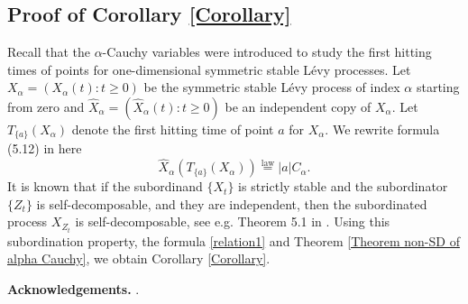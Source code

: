\documentclass[12pt]{amsart}
\begin{document}
\subsection{Proof of Corollary \ref{Corollary}}
Recall that the $\alpha$-Cauchy variables were introduced to study the first hitting times of points for one-dimensional symmetric stable L\'evy processes. 
Let $X_\alpha = (X_\alpha(t): t\geq 0)$ be the symmetric stable L\'evy process of index $\alpha$ starting from zero and \(\hat{X}_\alpha = (\hat{X}_\alpha(t) : t \geq 0)\) be an independent copy of \(X_\alpha\).
Let $T_{\{a\}}(X_\alpha)$ denote the first hitting time of point $a$ for $X_\alpha$. We rewrite formula (5.12) in \cite{YYY09} here
 \begin{equation}
    \label{relation1}
\hat{X}_{\alpha}(T_{\{a\}}(X_{\alpha})) \overset{\text{law}}{=} |a|C_{\alpha}. 
 \end{equation}
It is known that if the subordinand $\{X_t\}$ is strictly stable and the subordinator $\{Z_t\}$ is self-decomposable, and they are independent, then the subordinated process ${X_{Z_t}}$ is self-decomposable, see e.g. Theorem 5.1 in \cite{AS19}. 
Using this subordination property, the formula \eqref{relation1} and Theorem \ref{Theorem non-SD of alpha Cauchy}, we obtain Corollary \ref{Corollary}.








\bigskip

\noindent
\textbf{Acknowledgements.} .



 

\end{document}
